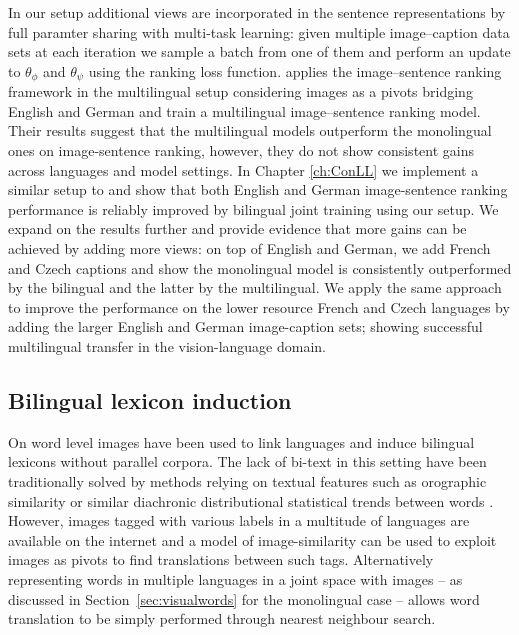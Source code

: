 In our setup additional views are incorporated in the sentence representations
by full paramter sharing with multi-task learning: 
given multiple image--caption data sets at each iteration we sample 
a batch from one of them and perform an update  to $\theta_{\phi}$ and $\theta_{\psi}$
using the ranking loss function.
\cite{gella2017image} applies the image--sentence ranking framework in the multilingual setup
considering images as a pivots bridging English and German and train a multilingual
image--sentence ranking model.
Their results suggest that the multilingual models outperform the monolingual ones on image-sentence
ranking, however, they do not show consistent gains across languages and model settings.
In Chapter \ref{ch:ConLL} we implement a similar setup to \cite{gella2017image}
and  show that both English and German image-sentence
ranking performance is reliably improved by bilingual joint training using our setup.
We expand on the results further and provide evidence that more gains can be
achieved by adding more views: on top of English and German, we
add French and Czech captions and show the monolingual model is consistently 
outperformed by the bilingual and the latter by the multilingual. 
We apply the same approach to improve the performance on the lower resource
French and Czech languages by adding the larger
English and German image-caption sets; showing successful multilingual
transfer in the vision-language domain.


\subsection{Bilingual lexicon induction}
\label{sec:bilinglex}

On word level images have been used to link languages and induce bilingual
lexicons without parallel corpora. The lack of bi-text in this setting have
been traditionally solved by methods relying on textual features
such as orographic similarity \citep{haghighi2008learning} or similar diachronic distributional
statistical trends between words \citep{schafer2002inducing}.
However, images tagged with various labels in a multitude of languages are
available on the internet and a model of image-similarity can be used to exploit
images as pivots to find translations between such tags. Alternatively representing words in multiple
languages in a joint space with images 
-- as discussed in Section~\ref{sec:visualwords} for the monolingual case --
allows word translation to be simply performed through nearest neighbour search.

